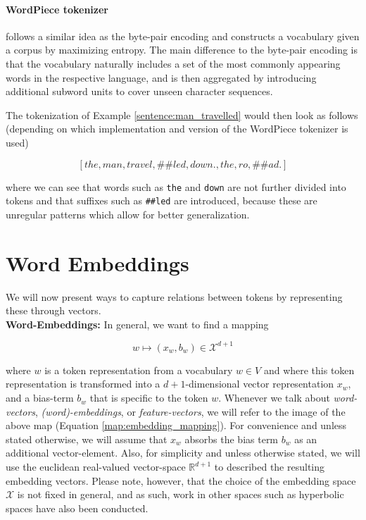 \documentclass[a4paper,12pt,oneside,openright]{report}
\begin{document}
\paragraph{WordPiece tokenizer} \label{tokenizer:WordPiece} \cite{wu16} follows a similar idea as the byte-pair encoding and constructs a vocabulary given a corpus by maximizing entropy.
The main difference to the byte-pair encoding is that the vocabulary naturally includes a set of the most commonly appearing words in the respective language, and is then aggregated by introducing additional subword units to cover unseen character sequences.

The tokenization of Example \ref{sentence:man_travelled} would then look as follows (depending on which implementation and version of the WordPiece tokenizer is used)

$$
[the, man, travel, \#\#led, down., the, ro,  \#\#ad.]
$$

where we can see that words such as \Verb#the# and \Verb#down# are not further divided into tokens and that suffixes such as \Verb!##led! are introduced, because these are unregular patterns which allow for better generalization.






\section{Word Embeddings}

We will now present ways to capture relations between tokens by representing these through vectors. \\

\textbf{Word-Embeddings:} In general, we want to find a mapping 

\begin{equation}
\label{map:embedding_mapping}
w \mapsto (x_w, b_w) \in \mathcal{X}^{d + 1}
\end{equation}

where $w$ is a token representation from a vocabulary $w \in V$ and where this token representation is transformed into a $d+1$-dimensional vector representation $x_w$, and a bias-term $b_w$ that is specific to the token $w$.
Whenever we talk about \textit{word-vectors}, \textit{(word)-embeddings}, or \textit{feature-vectors}, we will refer to the image of the above map (Equation \ref{map:embedding_mapping}). 
For convenience and unless stated otherwise, we will assume that $x_w$ absorbs the bias term $b_w$ as an additional vector-element.
Also, for simplicity and unless otherwise stated, we will use the euclidean real-valued vector-space $\mathbb{R}^{d+1}$ to described the resulting embedding vectors.
Please note, however, that the choice of the embedding space $\mathcal{X}$ is not fixed in general, and as such, work in other spaces such as hyperbolic spaces  \cite{ganea18} have also been conducted. \\
\end{document}
